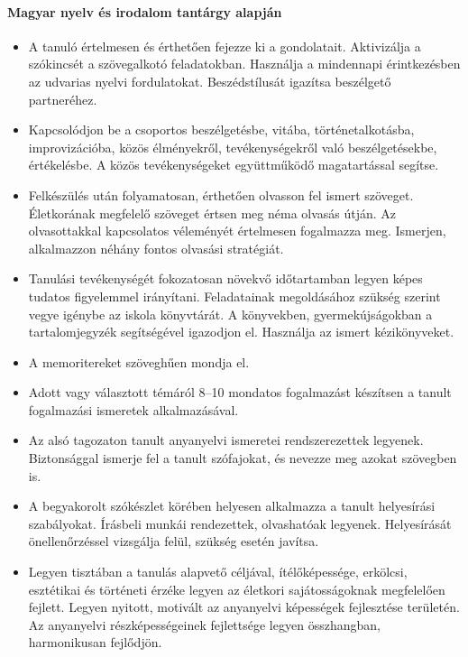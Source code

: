 \paragraph{Magyar nyelv és irodalom tantárgy alapján}
\begin{itemize}
\item A tanuló értelmesen és érthetően fejezze ki a gondolatait. Aktivizálja a szókincsét a szövegalkotó feladatokban. Használja a mindennapi érintkezésben az udvarias nyelvi fordulatokat. Beszédstílusát igazítsa beszélgető partneréhez.
\item Kapcsolódjon be a csoportos beszélgetésbe, vitába, történetalkotásba, improvizációba, közös élményekről, tevékenységekről való beszélgetésekbe, értékelésbe. A közös tevékenységeket együttműködő magatartással segítse.
\item Felkészülés után folyamatosan, érthetően olvasson fel ismert szöveget. Életkorának megfelelő szöveget értsen meg néma olvasás útján. Az olvasottakkal kapcsolatos véleményét értelmesen fogalmazza meg. Ismerjen, alkalmazzon néhány fontos olvasási stratégiát.
\item Tanulási tevékenységét fokozatosan növekvő időtartamban legyen képes tudatos figyelemmel irányítani. Feladatainak megoldásához szükség szerint vegye igénybe az iskola könyvtárát. A könyvekben, gyermekújságokban a tartalomjegyzék segítségével igazodjon el. Használja az ismert kézikönyveket.
\item A memoritereket szöveghűen mondja el.
\item Adott vagy választott témáról 8–10 mondatos fogalmazást készítsen a tanult fogalmazási ismeretek alkalmazásával.
\item Az alsó tagozaton tanult anyanyelvi ismeretei rendszerezettek legyenek. Biztonsággal ismerje fel a tanult szófajokat, és nevezze meg azokat szövegben is.
\item A begyakorolt szókészlet körében helyesen alkalmazza a tanult helyesírási szabályokat. Írásbeli munkái rendezettek, olvashatóak legyenek. Helyesírását önellenőrzéssel vizsgálja felül, szükség esetén javítsa.
\item Legyen tisztában a tanulás alapvető céljával, ítélőképessége, erkölcsi, esztétikai és történeti érzéke legyen az életkori sajátosságoknak megfelelően fejlett. Legyen nyitott, motivált az anyanyelvi képességek fejlesztése területén. Az anyanyelvi részképességeinek fejlettsége legyen összhangban, harmonikusan fejlődjön.
\end{itemize}
